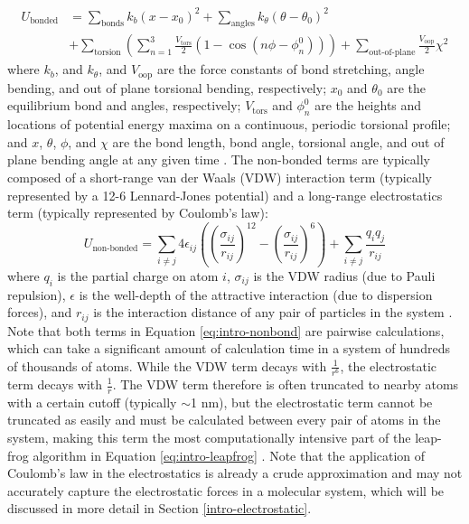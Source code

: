 \begin{equation}
    \begin{split}
        U_{\text{bonded}} &= \sum_{\text{bonds}} k_b(x-x_0)^2 + \sum_{\text{angles}} k_\theta (\theta - \theta_0)^2 \\
        &+ \sum_{\text{torsion}} \left ( \sum_{n = 1}^3 \frac{V_\text{tors}}{2} (1 - \cos (n \phi - \phi_n^0) ) \right ) + \sum_{\text{out-of-plane}} \frac{V_\text{oop}}{2} \chi^2
    \end{split}
    \label{eq:intro-bond}
\end{equation}
where $k_b$, and $k_\theta$, and $V_\text{oop}$ are the force constants of bond stretching, angle bending, and out of plane torsional bending, respectively; 
$x_0$ and $\theta_0$ are the equilibrium bond and angles, respectively; 
$V_\text{tors}$ and $\phi_n^0$ are the heights and locations of potential energy maxima on a continuous, periodic torsional profile; 
and $x$, $\theta$, $\phi$, and $\chi$ are the bond length, bond angle, torsional angle, and out of plane bending angle at any given time \cite{Kollman1981, Weiner1981, Weiner1984, Cornell1995, Duan2003, Jorgensen1996, Kaminski2001, Best2012}. 
The non-bonded terms are typically composed of a short-range van der Waals (VDW) interaction term (typically represented by a 12-6 Lennard-Jones potential) and a long-range electrostatics term (typically represented by Coulomb's law): 
\begin{equation}
    U_\text{non-bonded} = \sum_{i \ne j} 4 \epsilon_{ij} \left ( \left (\frac{\sigma_{ij}}{r_{ij}} \right )^{12} - \left (\frac{\sigma_{ij}}{r_{ij}} \right )^6 \right ) + \sum_{i \ne j} \frac{q_i q_j}{r_{ij}}
    \label{eq:intro-nonbond}
\end{equation}
where $q_i$ is the partial charge on atom $i$, $\sigma_{ij}$ is the VDW radius (due to Pauli repulsion), $\epsilon$ is the well-depth of the attractive interaction (due to dispersion forces), and $r_{ij}$ is the interaction distance of any pair of particles in the system \cite{Kollman1981, Weiner1981, Weiner1984, Cornell1995, Duan2003, Jorgensen1996, Kaminski2001, Best2012}. 
Note that both terms in Equation \ref{eq:intro-nonbond} are pairwise calculations, which can take a significant amount of calculation time in a system of hundreds of thousands of atoms. 
While the VDW term decays with $\frac{1}{r^6}$, the electrostatic term decays with $\frac{1}{r}$. 
The VDW term therefore is often truncated to nearby atoms with a certain cutoff (typically $\sim$1 nm), but the electrostatic term cannot be truncated as easily and must be calculated between every pair of atoms in the system, making this term the most computationally intensive part of the leap-frog algorithm in Equation \ref{eq:intro-leapfrog} \cite{Pantoliano1988, Schreiber1992, Cheatham1995, Piana2012}. 
Note that the application of Coulomb's law in the electrostatics is already a crude approximation and may not accurately capture the electrostatic forces in a molecular system, 
which will be discussed in more detail in Section \ref{intro-electrostatic}. 



